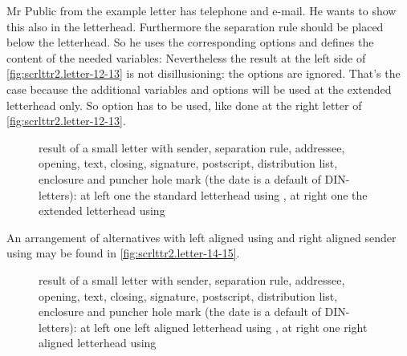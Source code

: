\begin{Example}
  Mr Public from the example letter has telephone and e-mail. He wants to show
  this also in the letterhead. Furthermore the separation rule should be
  placed below the letterhead. So he uses the corresponding options and
  defines the content of the needed variables:%
  Nevertheless the result at the left side of
  \autoref{fig:scrlttr2.letter-12-13} is not disillusioning: the options are
  ignored. That's the case because the additional variables and options will
  be used at the extended letterhead only. So option  has to
  be used, like done at the right letter of
  \autoref{fig:scrlttr2.letter-12-13}.
  \begin{figure}
    \centering
    \quad
    \caption[{Example: letter with extended sender, separation rule, addressee,
      opening, text, closing, signature, postscript, distribution list,
      enclosure, and puncher hole mark; standard vs. extended letterhead}]
    {result of a small letter with sender, separation rule, addressee,
      opening, text, closing, signature, postscript, distribution list,
      enclosure and puncher hole mark (the date is a default of DIN-letters):
      at left one the standard letterhead using
      , at right one the extended letterhead
      using }
    \label{fig:scrlttr2.letter-12-13}
  \end{figure}

  An arrangement of alternatives with left aligned using
   and right aligned sender
  using  may be found in
  \autoref{fig:scrlttr2.letter-14-15}.
  \begin{figure}
    \centering
    \quad
    \caption[{Example: letter with extended sender, separation rule, addressee,
      opening, text, closing, signature, postscript, distribution list,
      enclosure, and puncher hole mark; left vs. right aligned letterhead}]
    {result of a small letter with sender, separation rule, addressee,
      opening, text, closing, signature, postscript, distribution list,
      enclosure and puncher hole mark (the date is a default of DIN-letters):
      at left one left aligned letterhead using
      , at right one right aligned letterhead
      using }
    \label{fig:scrlttr2.letter-14-15}
  \end{figure}
\end{Example}
%
\EndIndexGroup


